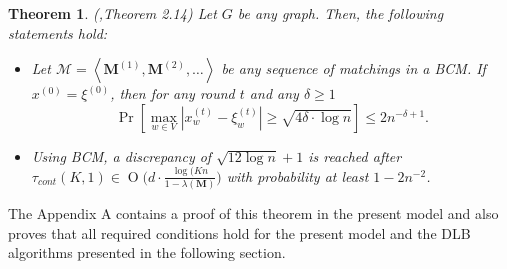 \documentclass[12pt,psfig,a4]{article}
\newtheorem{mytheorem}{Theorem}
\newcommand{\BigO}[1]{\ensuremath{\operatorname{O}\bigl(#1\bigr)}}
\theoremstyle{plain}
\begin{document}
\begin{mytheorem} (\cite{sauerwald2012tight},Theorem 2.14)
\label{theorem:result}
	Let $G$ be any graph. Then, the following statements hold:
	\begin{itemize}
		\item Let $\mathcal{M} = \left \langle  \mathbf{M}^{(1)},\mathbf{M}^{(2)},\ldots \right \rangle$ be any sequence of matchings in a BCM. If $x^{(0)}=\xi^{(0)}$, then for any round $t$ and any $\delta \geq 1$
		\begin{equation}
			\Pr\left [ \underset{w \in V}{\max}\left | x_w^{(t)} - \xi_w^{(t)}\right |   \geq \sqrt{4\delta \cdot \log{n}}\right ] \leq 2n^{-\delta + 1}.
		\end{equation}
		\item Using BCM, a discrepancy of $\sqrt{12\log{n}}+1$ is reached after $\tau_{cont}(K,1)\in \BigO{d \cdot \frac{\log{(Kn}}{1-\lambda(\mathbf{M})}}$ with probability at least $1-2n^{-2}$.
	\end{itemize}
\end{mytheorem}
The Appendix A contains a proof of this theorem in the present model and also proves that all required conditions hold for the present model and the DLB algorithms presented in the following section.
\end{document}
